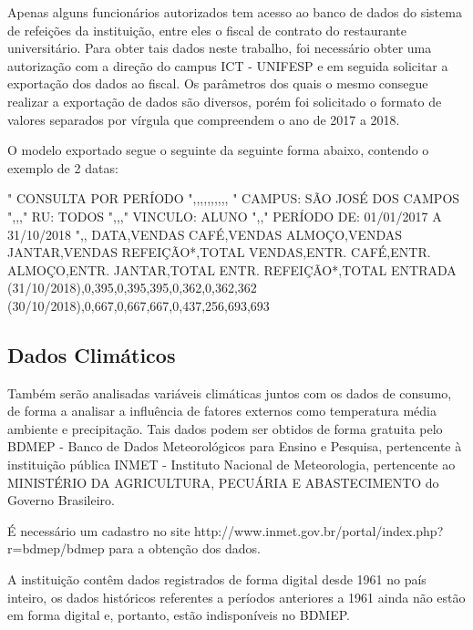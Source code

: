 \documentclass[	12pt, Times, openright, twoside, a4paper, english, brazil]{abntex2}
\begin{document}
        	Apenas alguns funcionários autorizados tem acesso ao banco de dados do sistema de refeições da instituição, entre eles o fiscal de contrato do restaurante universitário. Para obter tais dados neste trabalho, foi necessário obter uma autorização com a direção do campus ICT - UNIFESP e em seguida solicitar a exportação dos dados ao fiscal. Os parâmetros dos quais o mesmo consegue realizar a exportação de dados são diversos, porém foi solicitado o formato de valores separados por vírgula que compreendem o ano de 2017 a 2018.
    
        	O modelo exportado segue o seguinte da seguinte forma abaixo, contendo o exemplo de 2 datas: \\
        	\begin{algorithm}[H]
        		"
        		CONSULTA POR PERÍODO                    ",,,,,,,,,,
        		"
        		CAMPUS: SÃO JOSÉ DOS CAMPOS                    ",,,"
        		RU: TODOS                    ",,,"
        		VINCULO: ALUNO                    ",,"
        		PERÍODO DE: 01/01/2017 A 31/10/2018                        ",,
        		DATA,VENDAS CAFÉ,VENDAS ALMOÇO,VENDAS JANTAR,VENDAS REFEIÇÃO*,TOTAL VENDAS,ENTR. CAFÉ,ENTR. ALMOÇO,ENTR. JANTAR,TOTAL ENTR. REFEIÇÃO*,TOTAL ENTRADA
        		(31/10/2018),0,395,0,395,395,0,362,0,362,362
        		(30/10/2018),0,667,0,667,667,0,437,256,693,693
        	\end{algorithm}
        
        \subsection{Dados Climáticos}
        	Também serão analisadas variáveis climáticas juntos com os dados de consumo, de forma a analisar a influência de fatores externos como temperatura média ambiente e precipitação. Tais dados podem ser obtidos de forma gratuita pelo BDMEP - Banco de Dados Meteorológicos para Ensino e Pesquisa, pertencente à instituição pública INMET - Instituto Nacional de Meteorologia, pertencente ao MINISTÉRIO DA AGRICULTURA, PECUÁRIA E ABASTECIMENTO do Governo Brasileiro. 
        	
        	É necessário um cadastro no site http://www.inmet.gov.br/portal/index.php?r=bdmep/bdmep para a obtenção dos dados. 
        	
        	A instituição contêm dados registrados de forma digital desde 1961 no país inteiro, os dados históricos referentes a períodos anteriores a 1961 ainda não estão em forma digital e, portanto, estão indisponíveis no BDMEP.
        	
\end{document}
